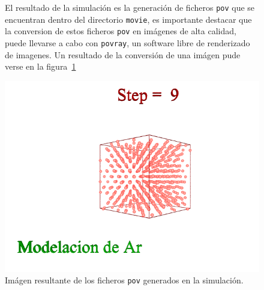
\begin{figure}[h!]
\begin{minipage}{8cm}
 El resultado de la simulaci\'on es la generaci\'on de ficheros \verb|pov| que se encuentran dentro del directorio \verb|movie|, es importante destacar que la conversion de estos ficheros \verb|pov| en im\'agenes de alta calidad, puede llevarse a cabo con \verb|povray|, un software libre de renderizado de imagenes. Un resultado de la conversi\'on de una im\'agen pude verse en la figura~\ref{fig:povrayex}
\end{minipage}
\hfill
\begin{minipage}{7cm}
\centering
 \includegraphics[scale=.3]{shoot-pov.png}
\caption{Im\'agen resultante de los ficheros \texttt{pov} generados en la simulaci\'on.}
\label{fig:povrayex}
\end{minipage}
\end{figure}

% 
% 
% 
% 

